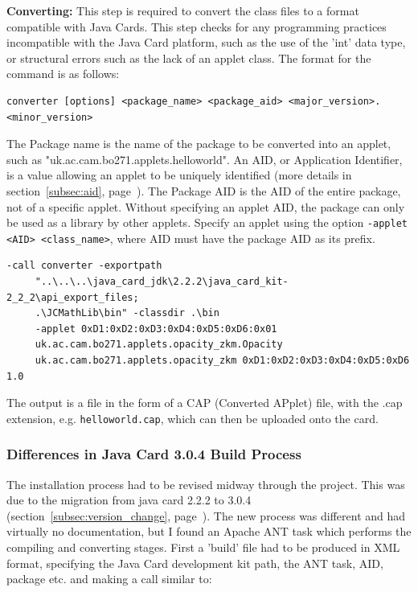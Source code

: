 \documentclass[12pt]{article}
\begin{document}
\textbf{Converting:} This step is required to convert the class files to a format compatible with Java Cards. This step checks for any programming practices incompatible with the Java Card platform, such as the use of the 'int' data type, or structural errors such as the lack of an applet class. The format for the command is as follows:
\begin{verbatim}
converter [options] <package_name> <package_aid> <major_version>.<minor_version>
\end{verbatim}

The Package name is the name of the package to be converted into an applet, such as "uk.ac.cam.bo271.applets.helloworld". An AID, or Application Identifier, is a value allowing an applet to be uniquely identified (more details in section~\ref{subsec:aid}, page~\pageref{subsec:aid}). The Package AID is the AID of the entire package, not of a specific applet. Without specifying an applet AID, the package can only be used as a library by other applets. Specify an applet using the option 
\verb|-applet <AID> <class_name>|, where AID must have the package AID as its prefix.

\begin{verbatim}
-call converter -exportpath 
     "..\..\..\java_card_jdk\2.2.2\java_card_kit-2_2_2\api_export_files;
     .\JCMathLib\bin" -classdir .\bin 
     -applet 0xD1:0xD2:0xD3:0xD4:0xD5:0xD6:0x01
     uk.ac.cam.bo271.applets.opacity_zkm.Opacity 
     uk.ac.cam.bo271.applets.opacity_zkm 0xD1:0xD2:0xD3:0xD4:0xD5:0xD6 1.0
\end{verbatim}

The output is a file in the form of a CAP (Converted APplet) file, with the .cap extension, e.g. \verb|helloworld.cap|, which can then be uploaded onto the card. 

\subsubsection{Differences in Java Card 3.0.4 Build Process}
The installation process had to be revised midway through the project. This was due to the migration from java card 2.2.2 to 3.0.4 (section~\ref{subsec:version_change}, page~\pageref{subsec:version_change}). The new process was different and had virtually no documentation, but I found an Apache ANT task which performs the compiling and converting stages. First a 'build' file had to be produced in XML format, specifying the Java Card development kit path, the ANT task, AID, package etc. and making a call similar to:
\end{document}
